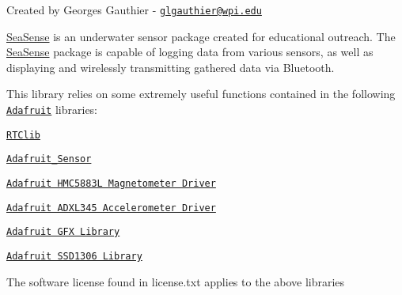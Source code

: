 Created by Georges Gauthier -\/ \href{mailto:glgauthier@wpi.edu}{\tt glgauthier@wpi.\+edu}

\hyperlink{class_sea_sense}{Sea\+Sense} is an underwater sensor package created for educational outreach. The \hyperlink{class_sea_sense}{Sea\+Sense} package is capable of logging data from various sensors, as well as displaying and wirelessly transmitting gathered data via Bluetooth.

This library relies on some extremely useful functions contained in the following \href{http://adafruit.com/}{\tt Adafruit} libraries\+:


\begin{DoxyItemize}
\item \href{https://github.com/adafruit/RTClib}{\tt R\+T\+Clib}
\item \href{https://github.com/adafruit/Adafruit_Sensor}{\tt Adafruit\+\_\+\+Sensor}
\item \href{https://github.com/adafruit/Adafruit_HMC5883_Unified}{\tt Adafruit H\+M\+C5883L Magnetometer Driver}
\item \href{https://github.com/adafruit/Adafruit_ADXL345}{\tt Adafruit A\+D\+X\+L345 Accelerometer Driver}
\item \href{https://github.com/adafruit/Adafruit-GFX-Library}{\tt Adafruit G\+FX Library}
\item \href{https://github.com/adafruit/Adafruit_SSD1306}{\tt Adafruit S\+S\+D1306 Library}
\end{DoxyItemize}

The software license found in license.\+txt applies to the above libraries 